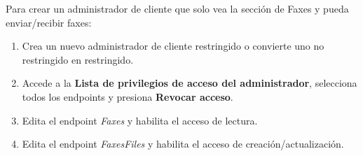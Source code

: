\documentclass[letterpaper,10pt,spanish]{sphinxmanual}
\begin{document}
Para crear un administrador de cliente que solo vea la sección de Faxes y pueda enviar/recibir faxes:
\begin{enumerate}
\item {} 
Crea un nuevo administrador de cliente restringido o convierte uno no restringido en restringido.

\item {} 
Accede a la \textbf{Lista de privilegios de acceso del administrador}, selecciona todos los endpoints y presiona \textbf{Revocar acceso}.

\item {} 
Edita el endpoint \emph{Faxes} y habilita el acceso de lectura.

\item {} 
Edita el endpoint \emph{FaxesFiles} y habilita el acceso de creación/actualización.

\end{enumerate}



\renewcommand{\indexname}{Índice}
\printindex
\end{document}
